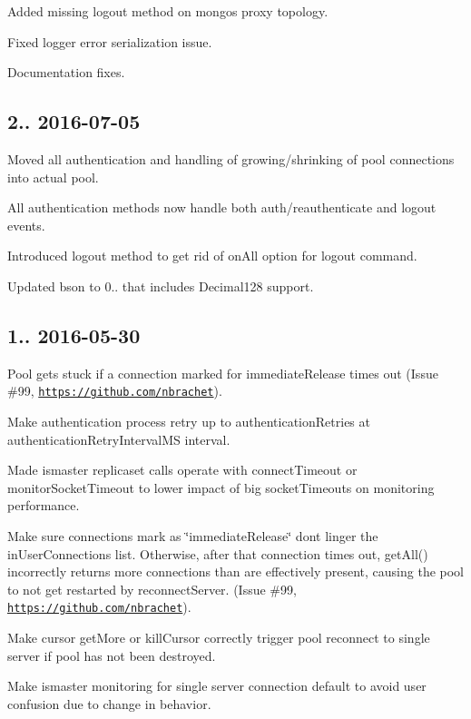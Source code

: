 \begin{DoxyItemize}
\item Added missing logout method on mongos proxy topology.
\item Fixed logger error serialization issue.
\item Documentation fixes.
\end{DoxyItemize}

\subsection*{2.. 2016-\/07-\/05 }


\begin{DoxyItemize}
\item Moved all authentication and handling of growing/shrinking of pool connections into actual pool.
\item All authentication methods now handle both auth/reauthenticate and logout events.
\item Introduced logout method to get rid of on\+All option for logout command.
\item Updated bson to 0.. that includes Decimal128 support.
\end{DoxyItemize}

\subsection*{1.. 2016-\/05-\/30 }


\begin{DoxyItemize}
\item Pool gets stuck if a connection marked for immediate\+Release times out (Issue \#99, \href{https://github.com/nbrachet}{\tt https\+://github.\+com/nbrachet}).
\item Make authentication process retry up to authentication\+Retries at authentication\+Retry\+Interval\+MS interval.
\item Made ismaster replicaset calls operate with connect\+Timeout or monitor\+Socket\+Timeout to lower impact of big socket\+Timeouts on monitoring performance.
\item Make sure connections mark as \char`\"{}immediate\+Release\char`\"{} don\textquotesingle{}t linger the in\+User\+Connections list. Otherwise, after that connection times out, get\+All() incorrectly returns more connections than are effectively present, causing the pool to not get restarted by reconnect\+Server. (Issue \#99, \href{https://github.com/nbrachet}{\tt https\+://github.\+com/nbrachet}).
\item Make cursor get\+More or kill\+Cursor correctly trigger pool reconnect to single server if pool has not been destroyed.
\item Make ismaster monitoring for single server connection default to avoid user confusion due to change in behavior.
\end{DoxyItemize}

